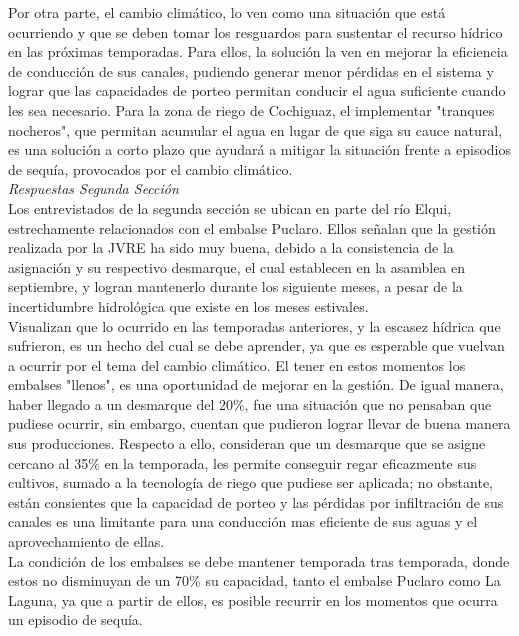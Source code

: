 \documentclass[11pt,]{article}
\begin{document}
Por otra parte, el cambio climático, lo ven como una situación que está ocurriendo y que se deben tomar los resguardos para sustentar el recurso hídrico en las próximas temporadas. Para ellos, la solución la ven en mejorar la eficiencia de conducción de sus canales, pudiendo generar menor pérdidas en el sistema y lograr que las capacidades de porteo permitan conducir el agua suficiente cuando les sea necesario. Para la zona de riego de Cochiguaz, el implementar "tranques nocheros", que permitan acumular el agua en lugar de que siga su cauce natural, es una solución a corto plazo que ayudará a mitigar la situación frente a episodios de sequía, provocados por el cambio climático. \\


\textit {Respuestas Segunda Sección}\\

 Los entrevistados de la segunda sección se ubican en parte del río Elqui, estrechamente relacionados con el embalse Puclaro. Ellos señalan que la gestión realizada por la JVRE ha sido muy buena, debido a la consistencia de la asignación y su respectivo desmarque, el cual establecen en la asamblea en septiembre, y logran mantenerlo durante los siguiente meses, a pesar de la incertidumbre hidrológica que existe en los meses estivales.\\
 
 Visualizan que lo ocurrido en las temporadas anteriores, y la escasez hídrica que sufrieron,  es un hecho del cual se debe aprender, ya que es esperable que vuelvan a ocurrir por el tema del cambio climático. El tener en estos momentos los embalses "llenos", es una oportunidad de mejorar en la gestión. De igual manera, haber llegado a un desmarque del 20\%, fue una situación que no pensaban que pudiese ocurrir, sin embargo, cuentan que pudieron lograr llevar de buena manera sus producciones. Respecto a ello, consideran que un desmarque que se asigne cercano al 35\% en la temporada, les permite conseguir regar eficazmente sus cultivos, sumado a la tecnología de riego que pudiese ser aplicada; no obstante, están consientes que la capacidad de porteo y las pérdidas por infiltración de sus canales es una limitante para una conducción mas eficiente de sus aguas y el aprovechamiento de ellas. \\
 
 La condición de los embalses se debe mantener temporada tras temporada, donde estos no disminuyan de un 70\% su capacidad, tanto el embalse Puclaro como La Laguna, ya que a partir de ellos, es posible recurrir en los momentos que ocurra un episodio de sequía. \\
 
\end{document}

